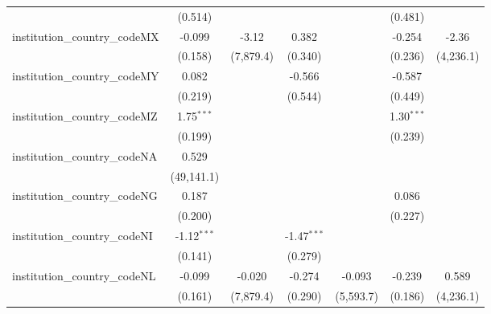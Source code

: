 \begin{tabular}{lcccccc}
                                         & (0.514)        &               &                &               & (0.481)        &   \\   
   institution\_country\_codeMX          & -0.099         & -3.12         & 0.382          &               & -0.254         & -2.36\\   
                                         & (0.158)        & (7,879.4)     & (0.340)        &               & (0.236)        & (4,236.1)\\   
   institution\_country\_codeMY          & 0.082          &               & -0.566         &               & -0.587         &   \\   
                                         & (0.219)        &               & (0.544)        &               & (0.449)        &   \\   
   institution\_country\_codeMZ          & 1.75$^{***}$   &               &                &               & 1.30$^{***}$   &   \\   
                                         & (0.199)        &               &                &               & (0.239)        &   \\   
   institution\_country\_codeNA          & 0.529          &               &                &               &                &   \\   
                                         & (49,141.1)     &               &                &               &                &   \\   
   institution\_country\_codeNG          & 0.187          &               &                &               & 0.086          &   \\   
                                         & (0.200)        &               &                &               & (0.227)        &   \\   
   institution\_country\_codeNI          & -1.12$^{***}$  &               & -1.47$^{***}$  &               &                &   \\   
                                         & (0.141)        &               & (0.279)        &               &                &   \\   
   institution\_country\_codeNL          & -0.099         & -0.020        & -0.274         & -0.093        & -0.239         & 0.589\\   
                                         & (0.161)        & (7,879.4)     & (0.290)        & (5,593.7)     & (0.186)        & (4,236.1)\\   

\end{tabular}
